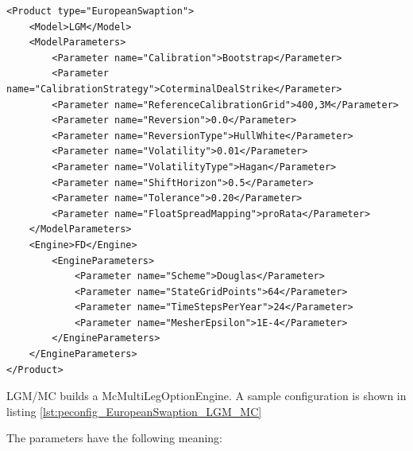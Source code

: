 \begin{longlisting}
\begin{verbatim}
<Product type="EuropeanSwaption">
    <Model>LGM</Model>
    <ModelParameters>
        <Parameter name="Calibration">Bootstrap</Parameter>
        <Parameter name="CalibrationStrategy">CoterminalDealStrike</Parameter>
        <Parameter name="ReferenceCalibrationGrid">400,3M</Parameter>
        <Parameter name="Reversion">0.0</Parameter>
        <Parameter name="ReversionType">HullWhite</Parameter>
        <Parameter name="Volatility">0.01</Parameter>
        <Parameter name="VolatilityType">Hagan</Parameter>
        <Parameter name="ShiftHorizon">0.5</Parameter>
        <Parameter name="Tolerance">0.20</Parameter>
        <Parameter name="FloatSpreadMapping">proRata</Parameter>
    </ModelParameters>
    <Engine>FD</Engine>
        <EngineParameters>
            <Parameter name="Scheme">Douglas</Parameter>
            <Parameter name="StateGridPoints">64</Parameter>
            <Parameter name="TimeStepsPerYear">24</Parameter>
            <Parameter name="MesherEpsilon">1E-4</Parameter>
        </EngineParameters>
    </EngineParameters>
</Product>
\end{verbatim}
\caption{Configuration for Product EuropeanSwaption, Model LGM, Engine FD}
\label{lst:peconfig_EuropeanSwaption_LGM_FD}
\end{longlisting}

LGM/MC builds a McMultiLegOptionEngine. A sample configuration is shown in
listing \ref{lst:peconfig_EuropeanSwaption_LGM_MC}

The parameters have the following meaning:

